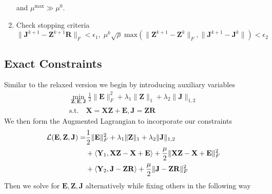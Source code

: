 \documentclass{article}
\begin{document}
\begin{enumerate}
and $\mu^{\text{max}} \gg  \mu^0$.

\item Check stopping criteria
\[
\|\mathbf J^{k+1} - \mathbf Z^{k+1} \mathbf R \|_F < \epsilon_1, \;
\mu^k \sqrt{\rho} \; \textrm{max} ( \| \mathbf Z^{k+1} - \mathbf Z^{k}  \|_F  , \|  \mathbf J^{k+1} - \mathbf J^{k} \|) < \epsilon_2
\]

\end{enumerate}

\subsection{Exact Constraints}

Similar to the relaxed version we begin by introducing auxiliary variables
\begin{align}
\label{objective_exact}
\min_{\mathbf Z, \mathbf E, \mathbf J} \frac12\|\mathbf E\|^2_F +\lambda_1\|\mathbf Z\|_{1}+\lambda_2\| \mathbf J \|_{1,2}\\
\text{s.t.} \quad \mathbf{X = XZ + E}, \mathbf{J = ZR} \nonumber
\end{align}
We then form the Augmented Lagrangian to incorporate our constraints
\begin{align}
\mathcal{L}(\mathbf E, \mathbf Z, \mathbf J) = & \frac12\|\mathbf E\|^2_F + \lambda_1 \|\mathbf Z\|_{1} + \lambda_2\|\mathbf J\|_{1,2} \notag\\
& + \langle \mathbf Y_1, \mathbf{XZ} - \mathbf X + \mathbf E \rangle +\frac{\mu}2\|\mathbf{XZ} - \mathbf X + \mathbf E\|^2_F \notag\\
& + \langle \mathbf Y_2, \mathbf J - \mathbf Z\mathbf R\rangle +\frac{\mu}2\|\mathbf J - \mathbf Z\mathbf R\|^2_F
\end{align}
Then we solve for $\mathbf{E, Z, J}$ alternatively while fixing others in the following way
\end{document}
